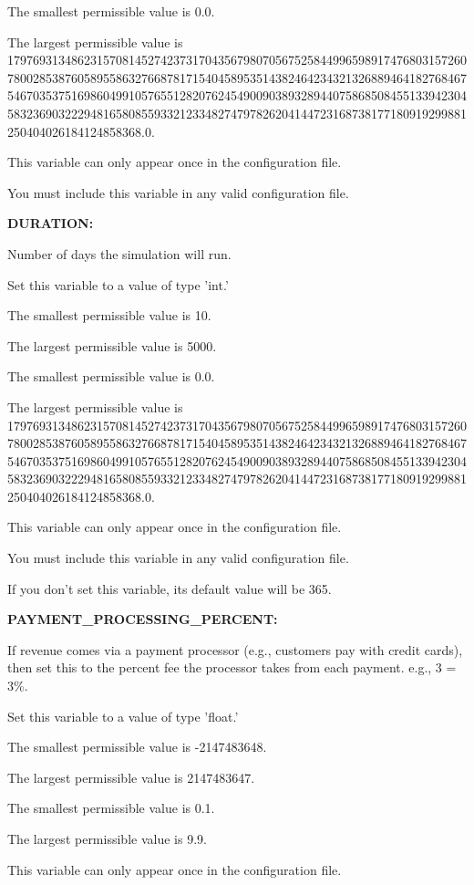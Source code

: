 The smallest permissible value is 0.0.

The largest permissible value is 179769313486231570814527423731704356798070567525844996598917476803157260780028538760589558632766878171540458953514382464234321326889464182768467546703537516986049910576551282076245490090389328944075868508455133942304583236903222948165808559332123348274797826204144723168738177180919299881250404026184124858368.0.

This variable can only appear once in the configuration file.

You must include  this variable in any valid configuration file.


\textbf{DURATION:}


Number of days the simulation will run.

Set this variable to a value of type 'int.'

The smallest permissible value is 10.

The largest permissible value is 5000.

The smallest permissible value is 0.0.

The largest permissible value is 179769313486231570814527423731704356798070567525844996598917476803157260780028538760589558632766878171540458953514382464234321326889464182768467546703537516986049910576551282076245490090389328944075868508455133942304583236903222948165808559332123348274797826204144723168738177180919299881250404026184124858368.0.

This variable can only appear once in the configuration file.

You must include  this variable in any valid configuration file.

If you don't set this variable, its default value will be 365.


\textbf{PAYMENT\_PROCESSING\_PERCENT:}


If revenue comes via a payment processor (e.g., customers pay with credit cards), then set this to the percent fee the processor takes from each payment.  e.g., 3 = 3\%.

Set this variable to a value of type 'float.'

The smallest permissible value is -2147483648.

The largest permissible value is 2147483647.

The smallest permissible value is 0.1.

The largest permissible value is 9.9.

This variable can only appear once in the configuration file.

